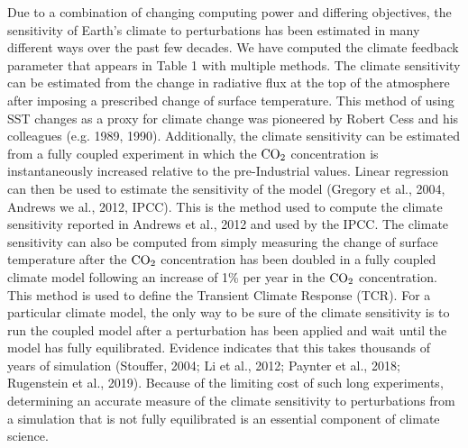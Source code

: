 \documentclass[draft]{agujournal2019}
\begin{document}
Due to a combination of changing computing power and differing objectives, the sensitivity of Earth's climate to 
perturbations has been estimated in many different ways over the past few decades.  
We have computed the climate feedback parameter that appears in Table 1 with multiple methods.    
The climate sensitivity can be estimated from the change in radiative flux at the top of the 
atmosphere after imposing a prescribed change of surface temperature.  This method of using SST changes
as a proxy for climate change was pioneered by Robert Cess and his colleagues (e.g. 1989, 1990).  
Additionally, the climate
sensitivity can be estimated from a fully coupled experiment in which the $\rm{CO}_{2}$ concentration is 
instantaneously increased relative to the pre-Industrial values.  Linear regression can then be used to 
estimate the sensitivity of the model (Gregory et al., 2004, Andrews we al., 2012, IPCC).  
This is the method used to compute the climate sensitivity reported in Andrews et al., 2012 
and used by the IPCC.  The climate sensitivity
can also be computed from simply measuring the change of surface temperature after the $\rm{CO}_{2}$ concentration
has been doubled in a fully coupled climate model following an increase of 1\% per year in the 
$\rm{CO}_{2}$ concentration.   This method is used to define the Transient Climate Response (TCR).
For a particular climate model, the only way to be sure of the climate sensitivity is to run the 
coupled model after a perturbation has been applied and wait until the model has fully 
equilibrated.  Evidence indicates that this takes thousands of years of 
simulation (Stouffer, 2004; Li et al., 2012; Paynter et al., 2018; Rugenstein et al., 2019).
Because of the limiting cost of such long experiments, determining an accurate measure 
of the climate sensitivity to perturbations from a simulation that is not fully equilibrated is an 
essential component of climate science.  
    
\end{document}
